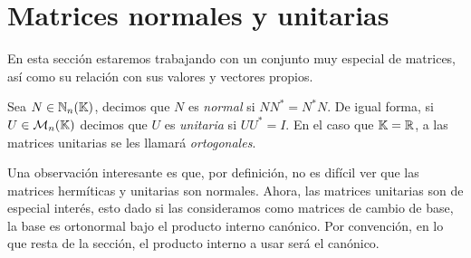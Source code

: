 \section{Matrices normales y unitarias}

En esta sección estaremos trabajando con un conjunto muy especial de matrices, así como su relación con sus valores y vectores propios. 

\begin{defi}
  Sea $N \in \mathbb{N}_n(\mathbb{K})$, decimos que $N$ es \emph{normal} si $NN^* = N^*N$. De igual forma, si $U\in\mathcal{M}_n(\mathbb{K})$ decimos que $U$ es \emph{unitaria} si $UU^* = I$. En el caso que $\mathbb{K} = \mathbb{R}$, a las matrices unitarias se les llamará \emph{ortogonales}.
\end{defi}

Una observación interesante es que, por definición, no es difícil ver que las matrices hermíticas y unitarias son normales. Ahora, las matrices unitarias son de especial interés, esto dado si las consideramos como matrices de cambio de base, la base es ortonormal bajo el producto interno canónico. Por convención, en lo que resta de la sección, el producto interno a usar será el canónico.

